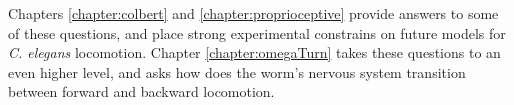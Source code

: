 Chapters \ref{chapter:colbert} and \ref{chapter:proprioceptive} provide answers to some of these questions, and place strong experimental constrains on future models for \textit{C. elegans} locomotion.  Chapter \ref{chapter:omegaTurn} takes these questions to an even higher level, and asks how does the worm's nervous system transition between forward and backward locomotion. 







